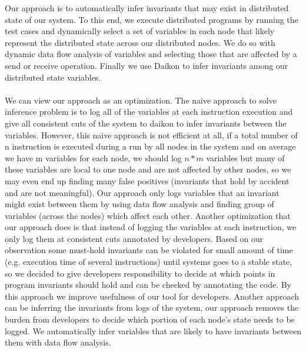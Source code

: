Our approach is to automatically infer invariants that may exist in distributed state of our system. To this end, we execute distributed programs by running the test cases and dynamically select a set of variables in each node that likely represent the distributed state 
across our distributed nodes. We do so with dynamic data flow analysis of variables and selecting those that are affected by a send or receive operation. Finally we use Daikon to infer invariants among our distributed state variables. \\ \\
We can view our approach as an optimization. The naive approach to solve inference problem is to log all of the variables at each instruction execution and give all consistent cuts of the system to daikon to infer invariants between the variables. However, this naive approach is not efficient at all, if a total number of n instruction is executed during a run by all nodes in the system and on average we have m variables for each node, we should log $n*m$ variables but many of these variables are local to one node and are not affected by other nodes, so we may even end up finding many false positives (invariants that hold by accident and are not meaningful). Our approach only logs variables that an invariant might exist between them by using data flow analysis and finding group of variables (across the nodes) which affect each other. 
Another optimization that our approach does is that instead of logging the variables at each instruction, we only log them at consistent cuts annotated by developers. Based on our observation some must-hold invariants can be violated for small amount of time (e.g. execution time of several instructions) until systems goes to a stable state, so we decided to give developers responsibility to decide at which points in program invariants should hold and can be checked by annotating the code. By this approach we improve usefulness of our tool for developers. Another approach can be inferring the invariants from logs of the system, our approach removes the burden from developers to decide which portion of each node's state needs to be logged. We automatically infer variables that are likely to have invariants between them with data flow analysis.